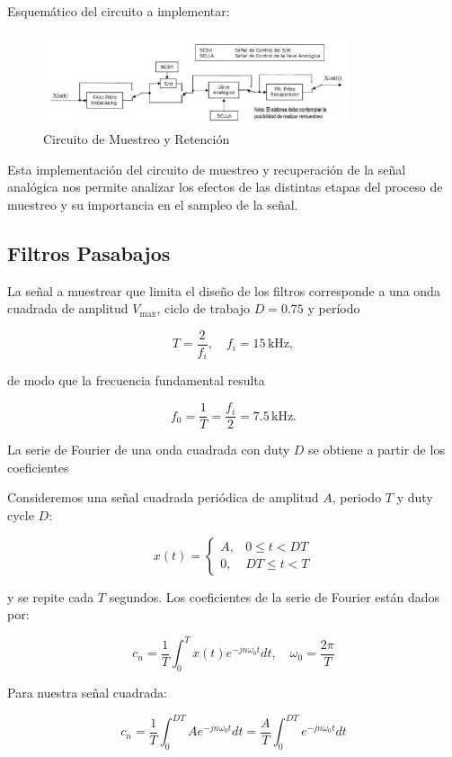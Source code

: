 Esquemático del circuito a implementar:

\begin{figure}[H]
    \centering
    \includegraphics[width=0.8\textwidth]{Imagenes/Circuito_Muestreo.png}
    \caption{Circuito de Muestreo y Retención}
    \label{fig:Circuito_Muestreo}
\end{figure}
Esta implementación del circuito de muestreo y recuperación de la señal analógica nos permite analizar 
los efectos de las distintas etapas del proceso de muestreo y su importancia en el sampleo de la señal.

\subsection{Filtros Pasabajos}

La señal a muestrear que limita el diseño de los filtros corresponde 
a una onda cuadrada de amplitud $V_{\max}$, ciclo de trabajo $D = 0.75$ 
y período

\[
T = \frac{2}{f_i}, \quad f_i = 15 \,\text{kHz},
\]

de modo que la frecuencia fundamental resulta

\[
f_0 = \frac{1}{T} = \frac{f_i}{2} = 7.5 \,\text{kHz}.
\]



La serie de Fourier de una onda cuadrada con duty $D$ se obtiene a partir 
de los coeficientes

Consideremos una señal cuadrada periódica de amplitud $A$, periodo $T$ y duty cycle $D$:

\[
x(t) =
\begin{cases}
A, & 0 \le t < D T \\
0, & D T \le t < T
\end{cases}
\]

y se repite cada $T$ segundos.
Los coeficientes de la serie de Fourier están dados por:

\[
c_n = \frac{1}{T} \int_0^T x(t) e^{-j n \omega_0 t} dt, \quad \omega_0 = \frac{2 \pi}{T}
\]

Para nuestra señal cuadrada:

\[
c_n = \frac{1}{T} \int_0^{D T} A e^{-j n \omega_0 t} dt
= \frac{A}{T} \int_0^{D T} e^{-j n \omega_0 t} dt
\]

